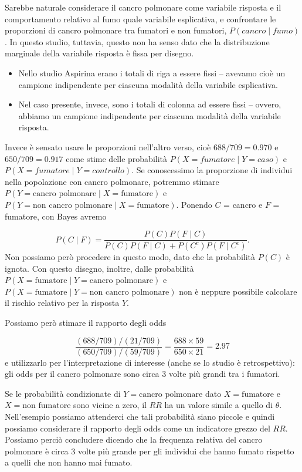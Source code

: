 \documentclass[
  11pt,
]{krantz}
\providecommand{\tightlist}{%
  \setlength{\itemsep}{0pt}\setlength{\parskip}{0pt}}
\theoremstyle{definition}
\theoremstyle{definition}
\theoremstyle{definition}
\theoremstyle{definition}
\theoremstyle{remark}
\begin{document}
Sarebbe naturale considerare il cancro polmonare come variabile risposta e il comportamento relativo al fumo quale variabile esplicativa, e confrontare le proporzioni di cancro polmonare tra fumatori e non fumatori, \(P(cancro \mid fumo)\). In questo studio, tuttavia, questo non ha senso dato che la distribuzione marginale della variabile risposta è fissa per disegno.

\begin{itemize}
\tightlist
\item
  Nello studio Aspirina erano i totali di riga a essere fissi -- avevamo cioè un campione indipendente per ciascuna modalità della variabile esplicativa.
\item
  Nel caso presente, invece, sono i totali di colonna ad essere fissi -- ovvero, abbiamo un campione indipendente per ciascuna modalità della variabile risposta.
\end{itemize}

Invece è sensato usare le proporzioni nell'altro verso, cioè \(688/709 = 0.970\) e \(650/709=0.917\) come stime delle probabilità \(P(X = fumatore \mid Y = caso)\) e \(P(X = fumatore \mid Y = controllo)\). Se conoscessimo la proporzione di individui nella popolazione con cancro polmonare, potremmo stimare \(P(Y = \text{cancro polmonare} \mid X = \text{fumatore})\) e \(P(Y = \text{non cancro polmonare} \mid X = \text{fumatore})\). Ponendo \(C\) = cancro e \(F\) = fumatore, con Bayes avremo

\[
P(C \mid F)=\frac{P(C)P(F \mid C)}{P(C)P(F \mid C) + P(C^c)P(F \mid C^c)}.
\] Non possiamo però procedere in questo modo, dato che la probabilità \(P(C)\) è ignota. Con questo disegno, inoltre, dalle probabilità \(P( X = \text{fumatore} \mid Y = \text{cancro polmonare})\) e \(P(X = \text{fumatore} \mid Y = \text{non cancro polmonare})\) non è neppure possibile calcolare il rischio relativo per la risposta \(Y\).

Possiamo però stimare il rapporto degli odds

\[
\frac{(688/709)/(21/709)}{(650/709)/(59/709)}=\frac{688 \times
59}{650 \times 21}=  2.97
\] e utilizzarlo per l'interpretazione di interesse (anche se lo studio è retrospettivo): gli odds per il cancro polmonare sono circa 3 volte più grandi tra i fumatori.

Se le probabilità condizionate di \(Y = \text{cancro polmonare}\) dato \(X = \text{fumatore}\) e \(X = \text{non fumatore}\) sono vicine a zero, il \(RR\) ha un valore simile a quello di \(\theta\). Nell'esempio possiamo attenderci che tali probabilità siano piccole e quindi possiamo considerare il rapporto degli odds come un indicatore grezzo del \(RR\). Possiamo perciò concludere dicendo che la frequenza relativa del cancro polmonare è circa 3 volte più grande per gli individui che hanno fumato rispetto a quelli che non hanno mai fumato.
\end{document}
